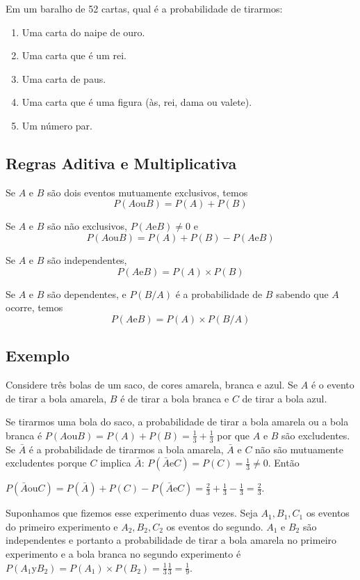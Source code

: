 Em um baralho de 52 cartas, qual é a probabilidade de tirarmos:

\begin{enumerate}
  \item Uma carta do naipe de ouro.
  \item Uma carta que é um rei.
  \item Uma carta de paus.
  \item Uma carta que é uma figura (às, rei, dama ou valete).
  \item Um número par.
\end{enumerate}

\subsection*{Regras Aditiva e Multiplicativa}

Se $A$ e $B$ são dois eventos mutuamente exclusivos, temos
$$
P(A \text{ou} B) = P(A) + P(B)
$$

Se $A$ e $B$ são não exclusivos, $P(A \text{e} B) \neq 0$ e 
$$
P(A \text{ou} B) = P(A) + P(B) - P(A \text{e} B)
$$

Se $A$ e $B$ são independentes,
$$
{P(A \text{e} B)} = {P(A)} \times {P(B)}
$$

Se $A$ e $B$ são dependentes, e $P\left(B/A\right)$ é a probabilidade
de $B$ sabendo que $A$ ocorre, temos
$$
{P(A \text{e} B)} = {P(A)} \times {P\left(B/A\right)}
$$

\subsection*{Exemplo}

Considere três bolas de um saco, de cores amarela, branca e azul.
Se $A$ é o evento de tirar a bola amarela, $B$ é de tirar a bola branca
e $C$ de tirar a bola azul.

Se tirarmos uma bola do saco, a probabilidade de tirar a bola amarela ou a bola
branca é
$P(A \text{ou} B) = P(A) + P(B) = \frac{1}{3} + \frac{1}{3}$ por que
$A$ e $B$ são excludentes. Se $\bar{A}$ é a probabilidade de tirarmos a bola
amarela, 
 $\bar{A}$ e $C$ não são mutuamente excludentes porque
$C$ implica $\bar{A}$:
$P(\bar{A} \text{e} C) = P(C) = \frac{1}{3} \neq 0$. Então

$
P(\bar{A} \text{ou} C) = P(\bar{A}) + P(C) - P(\bar{A} \text{e} C)
= \frac{2}{3} + \frac{1}{3} - \frac{1}{3} = \frac{2}{3}
$.

Suponhamos que fizemos esse experimento duas vezes.
Seja $A_1, B_1, C_1$ os eventos do primeiro experimento e
$A_2, B_2, C_2$ os eventos do segundo. $A_1$ e $B_2$ são independentes e
portanto a probabilidade de tirar a bola amarela no primeiro experimento
e a bola branca no segundo experimento é
$P(A_1 \text{y} B_2) = {P(A_1)} \times {P(B_2)} = \frac{1}{3} \frac{1}{3} =
\frac{1}{9}$.


